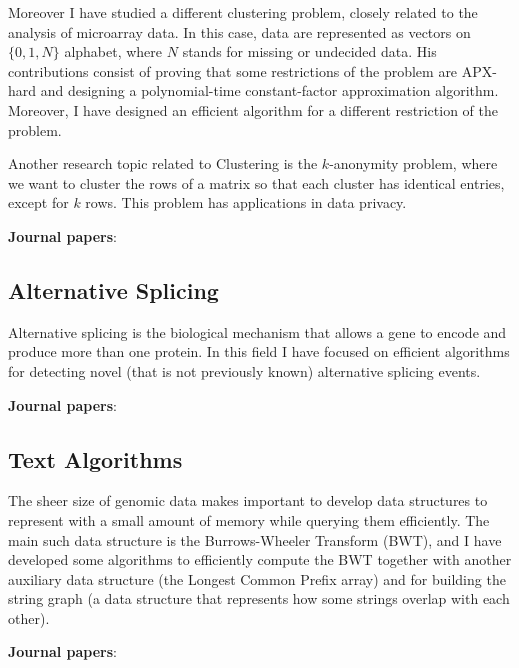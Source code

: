 \documentclass[11pt,a4paper,roman]{moderncv}
\begin{document}
Moreover I have studied a different clustering problem, closely related
to the analysis of microarray data. In this case, data are represented
as vectors on \(\{0,1,N\}\) alphabet, where \(N\) stands for missing or
undecided data. His contributions consist of proving that some
restrictions of the problem are APX-hard and designing a polynomial-time
constant-factor approximation algorithm. Moreover, I have designed an
efficient algorithm for a different restriction of the problem.

Another research topic related to Clustering is the \(k\)-anonymity problem,
where we want to cluster the rows of a matrix so that each cluster has identical
entries, except for \(k\) rows.
This problem has applications in data privacy.


\textbf{Journal papers}:~\cite{DBLP:journals/titb/CiccolellaPBV21,DBLP:journals/jco/BonizzoniVDP13,DBLP:journals/tcs/BonizzoniVD12,DBLP:journals/jco/BonizzoniVD11,DBLP:journals/algorithmica/BonizzoniVDM10,DBLP:journals/jcss/BonizzoniVDJ08}

\subsection{Alternative Splicing}\label{splicing}

Alternative splicing is the biological mechanism that allows a gene to encode
and produce more than one protein.
In this field I have focused on efficient algorithms for detecting novel (that
is not previously known) alternative splicing events.


\textbf{Journal papers}:~\cite{DBLP:journals/bmcbi/DentiRBVPB18,DBLP:journals/jcb/BerettaBVPR14,DBLP:journals/bmcbi/PirolaRPPVB12}

\subsection{Text Algorithms}\label{bwt}

The sheer size of genomic data makes important to develop data structures to
represent with a small amount of memory while querying them efficiently.
The main such data structure is the Burrows-Wheeler Transform (BWT), and I have
developed some algorithms to efficiently compute the BWT together with another
auxiliary data structure (the Longest Common Prefix array) and for building the
string graph (a data structure that represents how some strings overlap with
each other).

\textbf{Journal papers}:~\cite{DBLP:journals/tcs/BonizzoniVPPR21,DBLP:journals/jcb/BonizzoniVPPR19,DBLP:journals/quanbio/RizziBPPPVB19,DBLP:journals/algorithmica/BonizzoniVPPR17,DBLP:journals/jcb/BonizzoniVPPR17,DBLP:journals/jcb/BonizzoniVPPR16}
\end{document}
